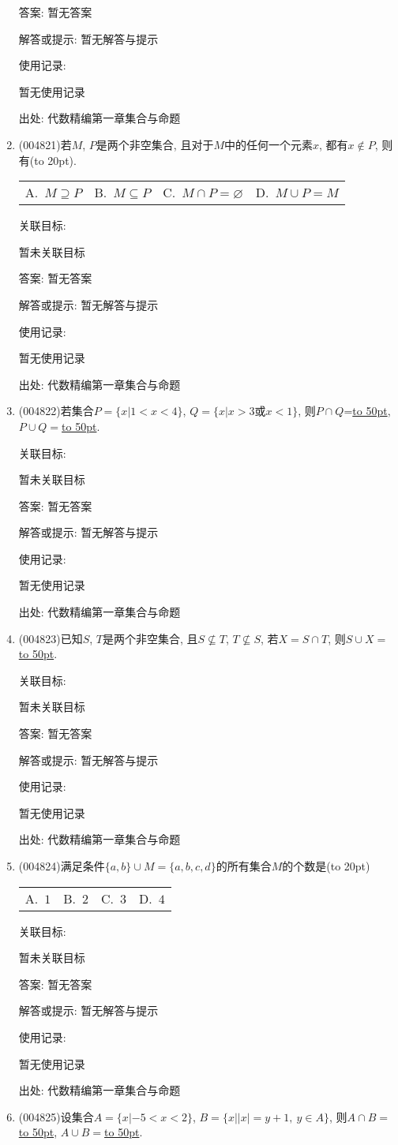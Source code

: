 \documentclass[10pt,a4paper]{article}
\newcommand{\blank}[1]{\underline{\hbox to #1pt{}}}
\newcommand{\bracket}[1]{(\hbox to #1pt{})}
\newcommand{\fourch}[4]{\par\begin{tabular}{p{.23\textwidth}p{.23\textwidth}p{.23\textwidth}p{.23\textwidth}}
A.~#1 &B.~#2& C.~#3& D.~#4
\end{tabular}}
\begin{document}
\begin{enumerate}[1.]
答案: 暂无答案

解答或提示: 暂无解答与提示

使用记录:

暂无使用记录


出处: 代数精编第一章集合与命题
\item { (004821)}若$M$, $P$是两个非空集合, 且对于$M$中的任何一个元素$x$, 都有$x\notin P$, 则有\bracket{20}.
\fourch{$M\supseteq P$}{$M\subseteq P$}{$M\cap P=\varnothing$}{$M\cup P=M$}


关联目标:

暂未关联目标

答案: 暂无答案

解答或提示: 暂无解答与提示

使用记录:

暂无使用记录


出处: 代数精编第一章集合与命题
\item { (004822)}若集合$P=\{x|1<x<4\}$, $Q=\{x|x>3\text{或}x<1\}$, 则$P\cap Q$=\blank{50}, $P\cup Q=$\blank{50}.


关联目标:

暂未关联目标

答案: 暂无答案

解答或提示: 暂无解答与提示

使用记录:

暂无使用记录


出处: 代数精编第一章集合与命题
\item { (004823)}已知$S$, $T$是两个非空集合, 且$S\not\subseteq T$, $T\not\subseteq S$, 若$X=S\cap T$, 则$S\cup X=$\blank{50}.


关联目标:

暂未关联目标

答案: 暂无答案

解答或提示: 暂无解答与提示

使用记录:

暂无使用记录


出处: 代数精编第一章集合与命题
\item { (004824)}满足条件$\{a,b\}\cup M=\{a,b,c,d\}$的所有集合$M$的个数是\bracket{20}
\fourch{$1$}{$2$}{$3$}{$4$}


关联目标:

暂未关联目标

答案: 暂无答案

解答或提示: 暂无解答与提示

使用记录:

暂无使用记录


出处: 代数精编第一章集合与命题
\item { (004825)}设集合$A=\{x|-5<x<2\}$, $B=\{x||x|=y+1, \ y\in A\}$, 则$A\cap B=$\blank{50}, $A\cup B=$\blank{50}.



\end{enumerate}
\end{document}
